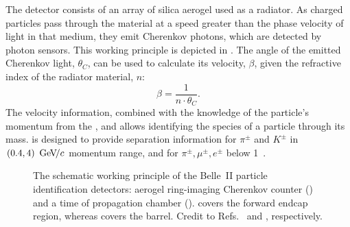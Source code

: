 The \ARICH detector \cite{Yusa:2014tua} consists of an array of silica aerogel used as a radiator.
As charged particles pass through the material at a speed greater than the phase velocity of light in that medium, 
they emit Cherenkov photons, which are detected by photon sensors.
This working principle is depicted in .
The angle of the emitted Cherenkov light, $\theta_C$, can be used to calculate its velocity, $\beta$, 
given the refractive index of the radiator material, $n$:
\begin{equation}
    \beta = \frac{1}{n\cdot\theta_C}.
\end{equation}
The velocity information, combined with the knowledge of the particle's momentum from the \CDC, \SVD and \PXD allows identifying the species of a particle through its mass.
\ARICH is designed to provide separation information for $\pi^{\pm}$ and $K^{\pm}$ in $(0.4,4)~{\mathrm{\,Ge\kern -0.1em V\!/}c}$ momentum range, and for $\pi^{\pm},\mu^{\pm},e^{\pm}$ below 1~\gevc.

\begin{figure}[hbtp!]
    \centering
    \caption{\label{fig:pid}
    The schematic working principle of the Belle~II particle identification detectors: aerogel ring-imaging Cherenkov counter () and a time of propagation chamber ().
    \ARICH covers the forward endcap region, whereas \TOP covers the barrel.
    Credit to Refs.~\cite{Yusa:2014tua} and \cite{Fast:2017pff}, respectively.
    }
\end{figure}

